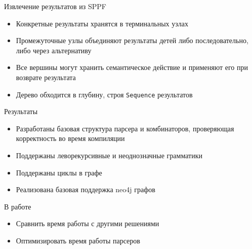 \documentclass[aspectratio=169]{beamer}
\begin{document}
\begin{frame}{Извлечение результатов из SPPF}
  \begin{itemize}
    \item Конкретные результаты хранятся в терминальных узлах
    \item Промежуточные узлы объединяют результаты детей либо последовательно, либо через альтернативу
    \item Все вершины могут хранить семантическое действие и применяют его при возврате результата
    \item Дерево обходится в глубину, строя \texttt{Sequence} результатов
  \end{itemize}
\end{frame}


\begin{frame}{Результаты}
  \begin{itemize}
    \item Разработаны базовая структура парсера и комбинаторов, проверяющая корректность во время компиляции
    \item Поддержаны леворекурсивные и неоднозначные грамматики
    \item Поддержаны циклы в графе
    \item Реализована базовая поддержка neo4j графов
  \end{itemize}
\end{frame}


\begin{frame}{В работе}
  \begin{itemize}
    \item Сравнить время работы с другими решениями
    \item Оптимизировать время работы парсеров
  \end{itemize}
\end{frame}
\end{document}
